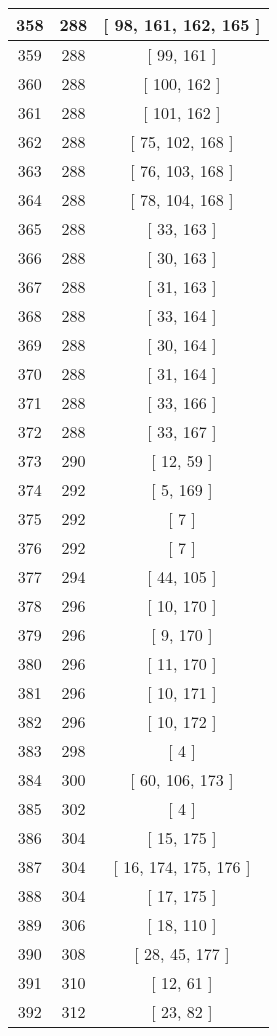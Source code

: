 \begin{center}
\begin{longtable}[H]{|| c c c ||}
\hline
358 & 288 & [ 98, 161, 162, 165 ] \\ 
\hline
359 & 288 & [ 99, 161 ] \\ 
\hline
360 & 288 & [ 100, 162 ] \\ 
\hline
361 & 288 & [ 101, 162 ] \\ 
\hline
362 & 288 & [ 75, 102, 168 ] \\ 
\hline
363 & 288 & [ 76, 103, 168 ] \\ 
\hline
364 & 288 & [ 78, 104, 168 ] \\ 
\hline
365 & 288 & [ 33, 163 ] \\ 
\hline
366 & 288 & [ 30, 163 ] \\ 
\hline
367 & 288 & [ 31, 163 ] \\ 
\hline
368 & 288 & [ 33, 164 ] \\ 
\hline
369 & 288 & [ 30, 164 ] \\ 
\hline
370 & 288 & [ 31, 164 ] \\ 
\hline
371 & 288 & [ 33, 166 ] \\ 
\hline
372 & 288 & [ 33, 167 ] \\ 
\hline
373 & 290 & [ 12, 59 ] \\ 
\hline
374 & 292 & [ 5, 169 ] \\ 
\hline
375 & 292 & [ 7 ] \\ 
\hline
376 & 292 & [ 7 ] \\ 
\hline
377 & 294 & [ 44, 105 ] \\ 
\hline
378 & 296 & [ 10, 170 ] \\ 
\hline
379 & 296 & [ 9, 170 ] \\ 
\hline
380 & 296 & [ 11, 170 ] \\ 
\hline
381 & 296 & [ 10, 171 ] \\ 
\hline
382 & 296 & [ 10, 172 ] \\ 
\hline
383 & 298 & [ 4 ] \\ 
\hline
384 & 300 & [ 60, 106, 173 ] \\ 
\hline
385 & 302 & [ 4 ] \\ 
\hline
386 & 304 & [ 15, 175 ] \\ 
\hline
387 & 304 & [ 16, 174, 175, 176 ] \\ 
\hline
388 & 304 & [ 17, 175 ] \\ 
\hline
389 & 306 & [ 18, 110 ] \\ 
\hline
390 & 308 & [ 28, 45, 177 ] \\ 
\hline
391 & 310 & [ 12, 61 ] \\ 
\hline
392 & 312 & [ 23, 82 ] \\ 

\end{longtable}
\end{center}
